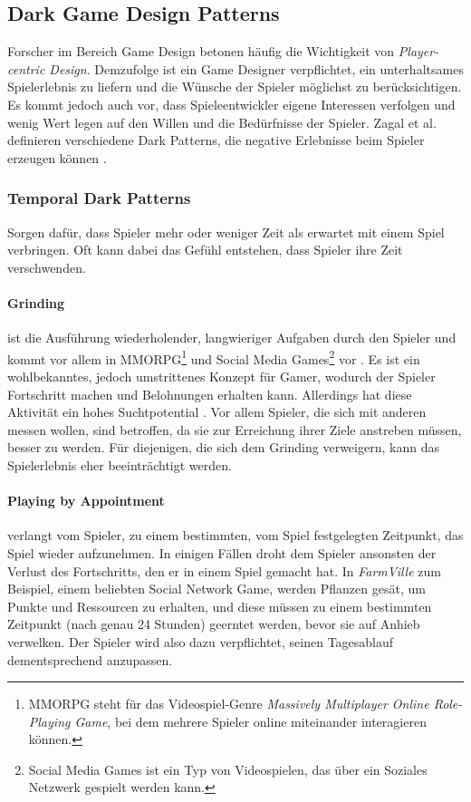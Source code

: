 \documentclass[a4paper]{article}
\begin{document}
\subsection{Dark Game Design Patterns}
\label{sub:games}
Forscher im Bereich Game Design betonen häufig die Wichtigkeit von \textit{Player-centric Design}. Demzufolge ist ein Game Designer verpflichtet, ein unterhaltsames Spielerlebnis zu liefern und die Wünsche der Spieler möglichst zu berücksichtigen.\newline
Es kommt jedoch auch vor, dass Spieleentwickler eigene Interessen verfolgen und wenig Wert legen auf den Willen und die Bedürfnisse der Spieler. Zagal et al. definieren verschiedene Dark Patterns, die negative Erlebnisse beim Spieler erzeugen können \cite{zagal}.

\subsubsection{Temporal Dark Patterns}
\label{sssec:temporal_dark_patterns}
Sorgen dafür, dass Spieler mehr oder weniger Zeit als erwartet mit einem Spiel verbringen. Oft kann dabei das Gefühl entstehen, dass Spieler ihre Zeit verschwenden.

\paragraph{Grinding}
\label{para:grinding}
ist die Ausführung wiederholender, langwieriger Aufgaben durch den Spieler und kommt vor allem in MMORPG\footnote{\label{foot:8} MMORPG steht für das Videospiel-Genre \textit{Massively Multiplayer Online Role-Playing Game}, bei dem mehrere Spieler online miteinander interagieren können.} und Social Media Games\footnote{\label{foot:9} Social Media Games ist ein Typ von Videospielen, das über ein Soziales Netzwerk gespielt werden kann.} vor \cite{nakamura}. Es ist ein wohlbekanntes, jedoch umstrittenes Konzept für Gamer, wodurch der Spieler Fortschritt machen und Belohnungen erhalten kann. Allerdings hat diese Aktivität ein hohes Suchtpotential \cite{king}.\newline 
Vor allem Spieler, die sich mit anderen messen wollen, sind betroffen, da sie zur Erreichung ihrer Ziele anstreben müssen, besser zu werden. Für diejenigen, die sich dem Grinding verweigern, kann das Spielerlebnis eher beeinträchtigt werden. 

\paragraph{Playing by Appointment}
\label{para:playing_by_appointment}
verlangt vom Spieler, zu einem bestimmten, vom Spiel festgelegten Zeitpunkt, das Spiel wieder aufzunehmen. In einigen Fällen droht dem Spieler ansonsten der Verlust des Fortschritts, den er in einem Spiel gemacht hat.\newline
In \textit{FarmVille} zum Beispiel, einem beliebten Social Network Game, werden Pflanzen gesät, um Punkte und Ressourcen zu erhalten, und diese müssen zu einem bestimmten Zeitpunkt (nach genau 24 Stunden) geerntet werden, bevor sie auf Anhieb verwelken. Der Spieler wird also dazu verpflichtet, seinen Tagesablauf dementsprechend anzupassen.
\end{document}
